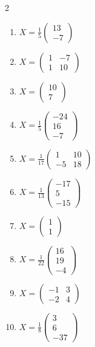\begin{multicols}{2}\raggedright
\begin{enumerate}[label=\arabic*., leftmargin=*, itemsep=1pt]
\item $X=\frac{1}{5}\left(\begin{smallmatrix}13\\ -7\end{smallmatrix}\right)$
\item $X=\left(\begin{smallmatrix}1 & -7\\ 1 & 10\end{smallmatrix}\right)$
\item $X=\left(\begin{smallmatrix}10\\ 7\end{smallmatrix}\right)$
\item $X=\frac{1}{5}\left(\begin{smallmatrix}-24\\ 16\\ -7\end{smallmatrix}\right)$
\item $X=\frac{1}{17}\left(\begin{smallmatrix}1 & 10\\ -5 & 18\end{smallmatrix}\right)$
\item $X=\frac{1}{13}\left(\begin{smallmatrix}-17\\ 5\\ -15\end{smallmatrix}\right)$
\item $X=\left(\begin{smallmatrix}1\\ 1\end{smallmatrix}\right)$
\item $X=\frac{1}{22}\left(\begin{smallmatrix}16\\ 19\\ -4\end{smallmatrix}\right)$
\item $X=\left(\begin{smallmatrix}-1 & 3\\ -2 & 4\end{smallmatrix}\right)$
\item $X=\frac{1}{8}\left(\begin{smallmatrix}3\\ 6\\ -37\end{smallmatrix}\right)$

\end{enumerate}
\end{multicols}
